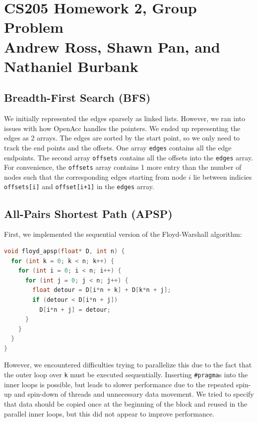 \documentclass[12pt]{article}
\newcommand*{\ttfamilywithbold}{\fontfamily{lmtt}\selectfont}
\begin{document}
\section*{CS205 Homework 2, Group Problem\\ \small Andrew Ross, Shawn Pan, and Nathaniel Burbank}

\subsection*{Breadth-First Search (BFS)}

We initially represented the edges sparsely as linked lists. However, we ran into issues with how OpenAcc handles the pointers. We ended up  representing the edges as 2 arrays. The edges are sorted by the start point, so we only need to track the end points and the offsets. One array \texttt{edges} contains all the edge endpoints. The second array \texttt{offsets} contains all the offsets into the \texttt{edges} array. For convenience, the \texttt{offsets} array contains 1 more entry than the number of nodes such that the corresponding edges starting from node $i$ lie between indicies \texttt{offsets[i]} and \texttt{offset[i+1]} in the \texttt{edges} array.

\subsection*{All-Pairs Shortest Path (APSP)}

First, we implemented the sequential version of the Floyd-Warshall algorithm:

\begin{lstlisting}[language=C,basicstyle=\ttfamilywithbold\footnotesize]
void floyd_apsp(float* D, int n) {
  for (int k = 0; k < n; k++) {
    for (int i = 0; i < n; i++) {
      for (int j = 0; j < n; j++) {
        float detour = D[i*n + k] + D[k*n + j];
        if (detour < D[i*n + j])
          D[i*n + j] = detour;
      }
    }
  }
}
\end{lstlisting}

However, we encountered difficulties trying to parallelize this due to the fact that the outer loop over \texttt{k} must be executed sequentially. Inserting \texttt{\#pragma}s into the inner loops is possible, but leads to slower performance due to the repeated spin-up and spin-down of threads and unnecessary data movement. We tried to specify that data should be copied once at the beginning of the block and reused in the parallel inner loops, but this did not appear to improve performance.
\end{document}
